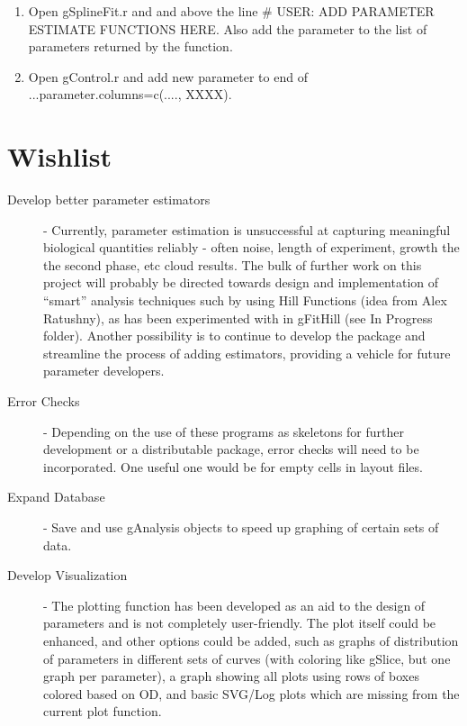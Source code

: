 \documentclass[11pt]{article}
\newcommand{\inlex}[1]{\ttfamily\small{#1}\rmfamily}
\begin{document}
\begin{spacing}{.1}
\begin{enumerate}
\item Open \inlex{gSplineFit.r} and and above the line \inlex{\# USER: ADD PARAMETER ESTIMATE FUNCTIONS HERE}. Also add the parameter to the list of parameters returned by the function.

\item Open \inlex{gControl.r} and add new parameter to end of  \inlex{...parameter.columns=c(...., XXXX)}.

\end{enumerate}


\section{Wishlist}
\begin{description}
\item[Develop better parameter estimators] - Currently, parameter estimation is unsuccessful at capturing meaningful biological quantities reliably - often noise, length of experiment, growth the the second phase, etc cloud results. The bulk of further work on this project will probably be directed towards design and implementation of ``smart'' analysis techniques such by using Hill Functions (idea from Alex Ratushny), as has been experimented with in gFitHill (see In Progress folder). Another possibility is to continue to develop the package and streamline the process of adding estimators, providing a vehicle for future parameter developers.

\item[Error Checks]- Depending on the use of these programs as skeletons for further development or a distributable package, error checks will need to be incorporated. One useful one would be for empty cells in layout files.

\item[Expand Database] - Save and use \inlex{gAnalysis} objects to speed up graphing of certain sets of data.

\item[Develop Visualization]- The plotting function has been developed as an aid to the design of parameters and is not completely user-friendly. The plot itself could be enhanced, and other options could be added, such as graphs of distribution of parameters in different sets of curves (with coloring like gSlice, but one graph per parameter), a graph showing all plots using rows of boxes colored based on OD, and basic SVG/Log plots which are missing from the current plot function.


\end{description}
\end{spacing}
\end{document}
